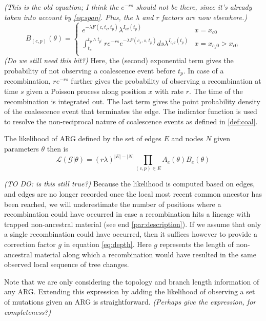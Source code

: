 \documentclass{article}
\newcommand{\comment}[1]{{\it \color{orange} (#1)}}
\begin{document}
\comment{This is the old equation; I think the $e^{-rs}$ should not be there,
    since it's already taken into account by \eqref{eq:span}.
    Plus, the $\lambda$ and $r$ factors are now elsewhere.}
\begin{equation}\label{eq:depth_old}
B_{(c, p)}(\theta) = \begin{cases}
e^{-\lambda F(c, t_c, t_p)} \lambda^{I_{cd}(t_p)} & x=x_{c0} \\
\int_{t_c}^{t_{p} \wedge t_{p^{\prime}}} r e^{-rs} e^{-\lambda F(c_s, s, t_{p})} ds \lambda^{I_{c_{s}d}(t_p)} & x=x_{c_{s}0}>x_{c0} \\
\end{cases}
\end{equation}
\comment{Do we still need this bit?}
Here, the (second) exponential term gives the probability of not observing a
coalescence event before $t_p$. In case of a recombination, $re^{-rs}$ further
gives the probability of observing a recombination
at time $s$ given a Poisson process along position $x$ with rate $r$.
The time of the recombination is integrated out.
The last term gives the point probability density of the coalescence event
that terminates the edge. The indicator function is used to resolve
the non-reciprocal nature of coalescence events as defined in \ref{def:coal}.

The likelihood of ARG defined by the set of edges $E$ and nodes $N$
given parameters $\theta$ then is
\begin{equation}\label{eq:full-lik}
    \mathcal{L}(\mathcal{G}|\theta)
    =
    (r\lambda)^{|E|-|N|} \prod_{(c, p) \in E} A_e(\theta) B_e(\theta)
\end{equation}


\comment{TO DO: is this still true?}
Because the likelihood is computed based on edges,
and edges are no longer recorded once the local most recent common ancestor
has been reached, we will underestimate the number of positions where
a recombination could have occurred in case a recombination hits a
lineage with trapped non-ancestral material (see end \ref{par:description}).
If we assume that only a single recombination could have
occurred, then it suffices however to provide a correction factor $g$ in equation
\ref{eq:depth}. Here $g$ represents the
length of non-ancestral material along which a recombination would have resulted
in the same observed local sequence of tree changes.

Note that we are only considering the topology and branch length information of any ARG.
Extending this expression by adding the likelihood of observing a set of mutations
given an ARG is straightforward.
\comment{Perhaps give the expression, for completeness?}
\end{document}
